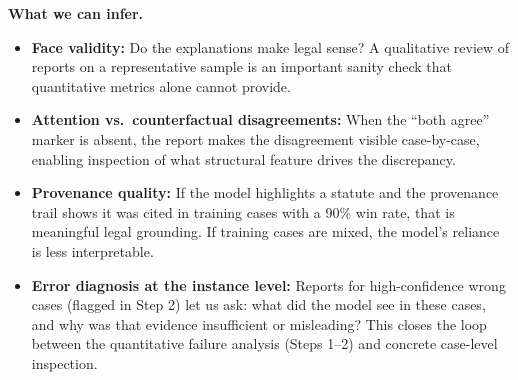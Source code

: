\documentclass[11pt,a4paper]{article}
\begin{document}
\textbf{What we can infer.}
\begin{itemize}
  \item \textbf{Face validity:} Do the explanations make legal sense? A qualitative
    review of reports on a representative sample is an important sanity check that
    quantitative metrics alone cannot provide.
  \item \textbf{Attention vs.\ counterfactual disagreements:} When the ``both agree''
    marker is absent, the report makes the disagreement visible case-by-case, enabling
    inspection of what structural feature drives the discrepancy.
  \item \textbf{Provenance quality:} If the model highlights a statute and the
    provenance trail shows it was cited in training cases with a 90\% win rate, that is
    meaningful legal grounding. If training cases are mixed, the model's reliance is
    less interpretable.
  \item \textbf{Error diagnosis at the instance level:} Reports for high-confidence
    wrong cases (flagged in Step 2) let us ask: what did the model see in these cases,
    and why was that evidence insufficient or misleading? This closes the loop between
    the quantitative failure analysis (Steps 1--2) and concrete case-level inspection.
\end{itemize}
\end{document}
